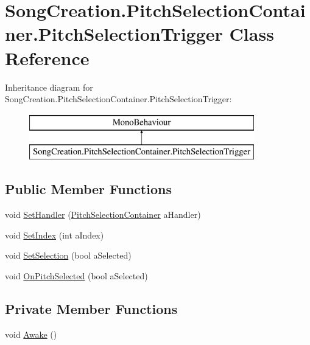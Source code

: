 \hypertarget{class_song_creation_1_1_pitch_selection_container_1_1_pitch_selection_trigger}{}\section{Song\+Creation.\+Pitch\+Selection\+Container.\+Pitch\+Selection\+Trigger Class Reference}
\label{class_song_creation_1_1_pitch_selection_container_1_1_pitch_selection_trigger}
Inheritance diagram for Song\+Creation.\+Pitch\+Selection\+Container.\+Pitch\+Selection\+Trigger\+:\begin{figure}[H]
\begin{center}
\leavevmode
\includegraphics[height=2.000000cm]{class_song_creation_1_1_pitch_selection_container_1_1_pitch_selection_trigger}
\end{center}
\end{figure}
\subsection*{Public Member Functions}
\begin{DoxyCompactItemize}
\item 
void \hyperlink{class_song_creation_1_1_pitch_selection_container_1_1_pitch_selection_trigger_a963bc1a13bdd44643cf814aa4976f3d0}{Set\+Handler} (\hyperlink{class_song_creation_1_1_pitch_selection_container}{Pitch\+Selection\+Container} a\+Handler)
\item 
void \hyperlink{class_song_creation_1_1_pitch_selection_container_1_1_pitch_selection_trigger_a1f01d4d64cc4697b0c403c007a014afa}{Set\+Index} (int a\+Index)
\item 
void \hyperlink{class_song_creation_1_1_pitch_selection_container_1_1_pitch_selection_trigger_a0eebfa085bd5326ed4cb4981cf02d2e0}{Set\+Selection} (bool a\+Selected)
\item 
void \hyperlink{class_song_creation_1_1_pitch_selection_container_1_1_pitch_selection_trigger_ac113e02950a228fc6c78ad5972238a98}{On\+Pitch\+Selected} (bool a\+Selected)
\end{DoxyCompactItemize}
\subsection*{Private Member Functions}
\begin{DoxyCompactItemize}
\item 
void \hyperlink{class_song_creation_1_1_pitch_selection_container_1_1_pitch_selection_trigger_ae07e3c0a5aa45a8b064abb9cea88c1d6}{Awake} ()
\end{DoxyCompactItemize}
